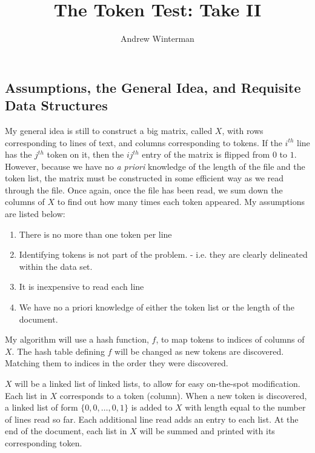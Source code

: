 \documentclass{article}
\begin{document}
\title{The Token Test: Take II}
\author{Andrew Winterman}

\maketitle

\subsection*{Assumptions, the General Idea, and Requisite Data Structures}

My general idea is still to construct a big matrix, called $X$, with rows corresponding to lines of text, and columns corresponding to tokens. If the $i^{th}$ line has the $j^{th}$ token on it, then the $ij^{th}$ entry of the matrix is flipped from $0$ to $1$. However, because we have no \textit{a priori} knowledge of the length of the file and the token list,  the matrix must be constructed in some efficient way as we read through the file. Once again, once the file has been read, we sum down the columns of $X$ to find out how many times each token appeared. My assumptions are listed below: 
 
\begin{enumerate}
\item There is no more than one token per line 
\item Identifying tokens is not part of the problem. - i.e. they are clearly delineated within the data set. \label{crucial}
\item It is inexpensive to read each line
\item We have no a priori knowledge of either the token list or the length of the document. \label{token}
\end{enumerate}

My algorithm will use a hash function, $f$, to map tokens to indices of columns of $X$. The hash table defining $f$ will be changed as new tokens are discovered. Matching them to indices in the order they were discovered.

$X$ will be a linked list of linked lists, to allow for easy on-the-spot modification. Each list in $X$ corresponds to a token (column). When a new token is discovered, a linked list of form $\{ 0,0,\dots,0, 1 \}$ is added to $X$ with length equal to the number of lines read so far. Each additional line read adds an entry to each list. At the end of the document, each list in $X$ will be summed and printed with its corresponding token.
\end{document}
